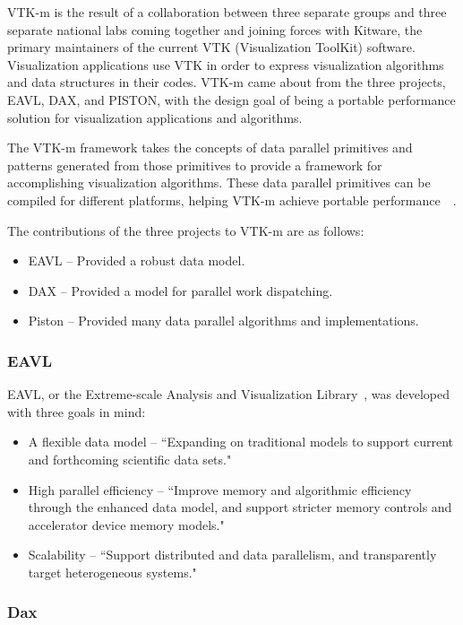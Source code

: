 VTK-m is the result of a collaboration between three separate groups and three separate national labs coming together and joining forces with Kitware, the primary maintainers of the current VTK (Visualization ToolKit) software.
%
Visualization applications use VTK in order to express visualization algorithms and data structures in their codes.
%
VTK-m came about from the three projects, EAVL, DAX, and PISTON, with the design goal of being a portable performance solution for visualization applications and algorithms.
%

The VTK-m framework takes the concepts of data parallel primitives and patterns generated from those primitives to provide a framework for accomplishing visualization algorithms.
%
These data parallel primitives can be compiled for different platforms, helping VTK-m achieve portable performance~\cite{Moreland:CGA2016}~\cite{JSFI77}.

The contributions of the three projects to VTK-m are as follows:
\begin{itemize}
\item EAVL -- Provided a robust data model. 
\item DAX -- Provided a model for parallel work dispatching. 
\item Piston -- Provided many data parallel algorithms and implementations.
\end{itemize}


\subsubsection*{\textbf{EAVL}}

EAVL, or the Extreme-scale Analysis and Visualization Library~\cite{jeremyEAVL}, was developed with three goals in mind:
\begin{itemize}
\item A flexible data model -- ``Expanding on traditional models to support current and forthcoming scientific data sets."
\item High parallel efficiency -- ``Improve memory and algorithmic efficiency through the enhanced data model, and support stricter memory controls and accelerator device memory models."
\item Scalability -- ``Support distributed and data parallelism, and transparently target heterogeneous systems."
\end{itemize}
%

\subsubsection*{\textbf{Dax}}

